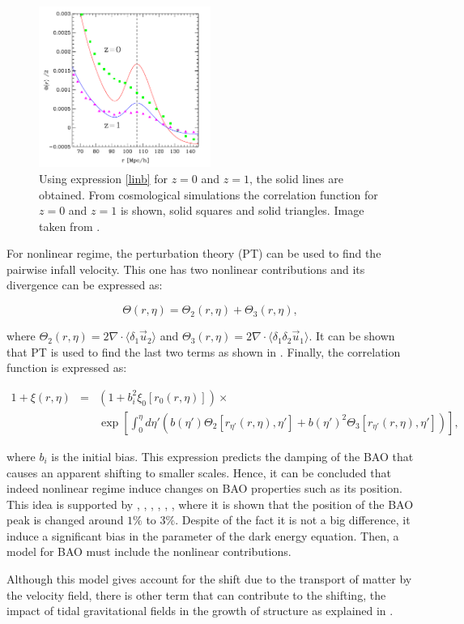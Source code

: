 \begin{figure}[htbp]
       \centering
               \includegraphics[width=0.5\textwidth]{Images/chapter2/shift.png}
       \caption{ \small Using expression \ref{linb} for $z=0$ and $z=1$, the solid lines are obtained. 	    From cosmological simulations the correlation function for $z=0$ 
       and $z=1$ is shown, solid squares and solid triangles. Image taken from \cite{motion}.}
       \label{sbao}
 \end{figure}

For nonlinear regime, the perturbation theory (PT) can be used to find the pairwise infall 
velocity. This one has two nonlinear contributions and its divergence can be expressed as: 

\begin{equation}
\Theta(r,\eta) = \Theta_2(r,\eta)+ \Theta_3(r,\eta) ,\nonumber
\end{equation}

where $\Theta_2(r,\eta)=2\nabla \cdot \langle \delta_1 \vec{u}_2 \rangle$ and 
$\Theta_3(r,\eta)=2\nabla \cdot \langle \delta_1\delta_2 \vec{u}_1 \rangle$. It
can be shown that PT is used to find the last two terms as shown in \cite{motion}. 
Finally, the correlation function is expressed as: 

\begin{eqnarray}
1 + \xi(r,\eta) &=& (1+b_i^2\xi_0[r_0(r,\eta)])\times \nonumber \\   & &\exp\left[\int_0^\eta d\eta'( b(\eta') \Theta_2[r_{\eta'}(r,\eta),\eta'] 
+ b(\eta')^2\Theta_3[r_{\eta'}(r,\eta), \eta'] )\right],
\end{eqnarray}


where $b_i$ is the initial bias. This expression predicts the damping of the BAO 
that causes an apparent shifting to smaller scales. 
Hence, it can be concluded that indeed nonlinear regime induce changes on BAO properties
such as its position.
This idea is supported by \cite{motion}, \cite{uno}, \cite{dos}, \cite{tres}, \cite{cuatro},
\cite{crocce}, where it is shown that the position of the BAO peak is changed 
around $1\%$ to $3\%$. Despite of the fact it is not a big difference, it induce a significant
bias in the parameter of the dark energy equation. Then, a model for BAO must include
the nonlinear contributions. 

Although this model gives account for the shift due to the transport of matter by the velocity
field, there is other term that can contribute to the shifting, the impact of tidal gravitational 
fields in the growth of structure as explained in \cite{crocce}.
 
 
